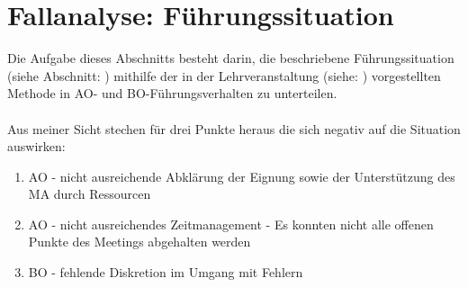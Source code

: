 \pagebreak

\section{Fallanalyse: Führungssituation}
\label{sec:fallanalyse}
Die Aufgabe dieses Abschnitts besteht darin, die beschriebene Führungssituation (siehe Abschnitt: ) mithilfe der in der Lehrveranstaltung (siehe: \cite{Duden2015}) vorgestellten Methode 
 in \ac{AO}- und \ac{BO}-Führungsverhalten zu unterteilen.\\
\\
Aus meiner Sicht stechen für drei Punkte heraus die sich negativ auf die Situation auswirken:

\begin{enumerate}
\item \ac{AO} - nicht ausreichende Abklärung der Eignung sowie der Unterstützung des \ac{MA} durch Ressourcen
\item \ac{AO} - nicht ausreichendes Zeitmanagement  - Es konnten nicht alle offenen Punkte des Meetings abgehalten werden
\item \ac{BO} - fehlende Diskretion im Umgang mit Fehlern
\end{enumerate}





